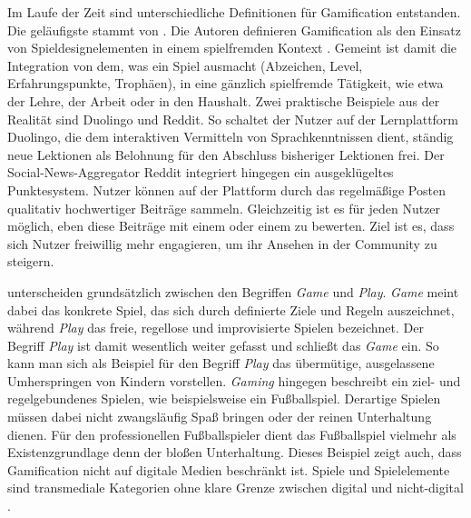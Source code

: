 Im Laufe der Zeit sind unterschiedliche Definitionen für Gamification entstanden. Die geläufigste stammt von . Die Autoren definieren Gamification als den Einsatz von Spieldesignelementen in einem spielfremden Kontext \cite{deterding_game_2011}. Gemeint ist damit die Integration von dem, was ein Spiel ausmacht (Abzeichen, Level, Erfahrungspunkte, Trophäen), in eine gänzlich spielfremde Tätigkeit, wie etwa der Lehre, der Arbeit oder in den Haushalt. Zwei praktische Beispiele aus der Realität sind Duolingo und Reddit. So schaltet der Nutzer auf der Lernplattform Duolingo, die dem interaktiven Vermitteln von Sprachkenntnissen dient, ständig neue Lektionen als Belohnung für den Abschluss bisheriger Lektionen frei. Der Social-News-Aggregator Reddit integriert hingegen ein ausgeklügeltes Punktesystem. Nutzer können auf der Plattform durch das regelmäßige Posten qualitativ hochwertiger Beiträge  sammeln. Gleichzeitig ist es für jeden Nutzer möglich, eben diese Beiträge mit einem  oder einem  zu bewerten. Ziel ist es, dass sich Nutzer freiwillig mehr engagieren, um ihr Ansehen in der Community zu steigern.

 unterscheiden grundsätzlich zwischen den Begriffen \textit{Game} und \textit{Play}. \textit{Game} meint dabei das konkrete Spiel, das sich durch definierte Ziele und Regeln auszeichnet, während \textit{Play} das freie, regellose und improvisierte Spielen bezeichnet. Der Begriff \textit{Play} ist damit wesentlich weiter gefasst und schließt das \textit{Game} ein. So kann man sich als Beispiel für den Begriff \textit{Play} das übermütige, ausgelassene Umherspringen von Kindern vorstellen. \textit{Gaming} hingegen beschreibt ein ziel- und regelgebundenes Spielen, wie beispielsweise ein Fußballspiel. Derartige Spielen müssen dabei nicht zwangsläufig Spaß bringen oder der reinen Unterhaltung dienen. Für den professionellen Fußballspieler dient das Fußballspiel vielmehr als  Existenzgrundlage denn der bloßen Unterhaltung. Dieses Beispiel zeigt auch, dass Gamification nicht auf digitale Medien beschränkt ist.  Spiele und Spielelemente sind transmediale Kategorien ohne klare Grenze zwischen digital und nicht-digital \cite{deterding_game_2011}.

